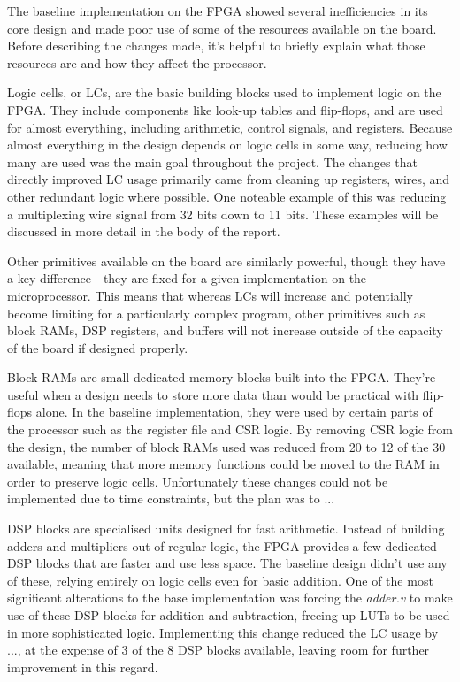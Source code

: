 \documentclass[a4paper,10pt]{article}
\begin{document}
The baseline implementation on the FPGA showed several inefficiencies 
in its core design and made poor use of 
some of the resources available on the board. 
Before describing the changes made, it's helpful to briefly explain 
what those resources are and how they affect the processor.

Logic cells, or LCs, are the basic building blocks used to 
implement logic on the FPGA. 
They include components like look-up tables and flip-flops, 
and are used for almost everything, including 
arithmetic, control signals, and registers. 
Because almost everything in the design depends on logic cells in some way, 
reducing how many are used was the main goal throughout the project.
The changes that directly improved LC usage primarily came from
cleaning up registers, wires, and other redundant logic where possible.
One noteable example of this was reducing a multiplexing wire signal
from 32 bits down to 11 bits. These examples will be discussed in more detail
in the body of the report.

Other primitives available on the board are similarly powerful,
though they have a key difference - they are fixed for a given implementation
on the microprocessor.
This means that whereas LCs will increase and potentially become limiting
for a particularly complex program, 
other primitives such as block RAMs, DSP registers, and buffers
will not increase outside of the capacity of the board if designed properly.

Block RAMs are small dedicated memory blocks built into the FPGA. 
They're useful when a design needs to store more data 
than would be practical with flip-flops alone. 
In the baseline implementation, 
they were used by certain parts of the processor 
such as the register file and CSR logic. 
By removing CSR logic from the design,
the number of block RAMs used was reduced 
from 20 to 12 of the 30 available,
meaning that more memory functions could be moved to the RAM 
in order to preserve logic cells.
Unfortunately these changes could not be implemented due to time constraints,
but the plan was to ...

DSP blocks are specialised units designed for fast arithmetic. 
Instead of building adders and multipliers out of regular logic, 
the FPGA provides a few dedicated DSP blocks that are faster and use less space. 
The baseline design didn't use any of these, 
relying entirely on logic cells even for basic addition. 
One of the most significant alterations to the base implementation
was forcing the \textit{adder.v} to make use of these DSP blocks
for addition and subtraction, 
freeing up LUTs to be used in more sophisticated logic.
Implementing this change reduced the LC usage by ..., 
at the expense of 3 of the 8 DSP blocks available,
leaving room for further improvement in this regard.
\end{document}
